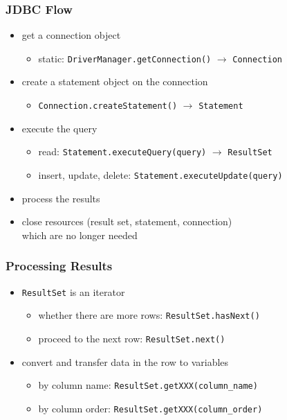 \documentclass[dvipsnames]{beamer}
\theoremstyle{plain}
\begin{document}
\begin{frame}
  \frametitle{JDBC Flow}

  \begin{itemize}
    \item get a connection object
    \begin{itemize}
      \item static: \lstinline!DriverManager.getConnection()!
	$\rightarrow$ \lstinline!Connection!
    \end{itemize}

    \pause
    \medskip
    \item create a statement object on the connection
    \begin{itemize}
      \item \lstinline!Connection.createStatement()!
	 $\rightarrow$ \lstinline!Statement!
    \end{itemize}

    \pause
    \medskip
    \item execute the query
    \begin{itemize}
      \item read: \lstinline!Statement.executeQuery(query)!
	$\rightarrow$ \lstinline!ResultSet!
      \item insert, update, delete: \lstinline!Statement.executeUpdate(query)!
    \end{itemize}

    \pause
    \medskip
    \item process the results

    \pause
    \medskip
    \item close resources (result set, statement, connection)\\
      which are no longer needed
  \end{itemize}
\end{frame}

\begin{frame}
  \frametitle{Processing Results}

  \begin{itemize}
    \item \lstinline!ResultSet! is an iterator
    \begin{itemize}
      \item whether there are more rows: \lstinline!ResultSet.hasNext()!
      \item proceed to the next row: \lstinline!ResultSet.next()!
    \end{itemize}

    \pause
    \medskip
    \item convert and transfer data in the row to variables
    \begin{itemize}
      \item by column name: \lstinline!ResultSet.getXXX(column_name)!
      \item by column order: \lstinline!ResultSet.getXXX(column_order)!
    \end{itemize}
  \end{itemize}
\end{frame}
\end{document}

